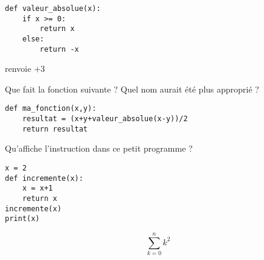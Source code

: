 \begin{frame}[fragile]
\begin{algo}
\begin{lstlisting}
def valeur_absolue(x):
    if x >= 0:
        return x
    else: 
        return -x
\end{lstlisting}
\end{algo}

\pause
{} renvoie $+3$

\bigskip
\pause

Que fait la fonction suivante ? Quel nom aurait été plus approprié ?

\begin{algo}
\begin{lstlisting}
def ma_fonction(x,y):
    resultat = (x+y+valeur_absolue(x-y))/2
    return resultat
\end{lstlisting}
\end{algo}
\end{frame}


%   
%   
%   


\begin{frame}[fragile]

Qu'affiche l'instruction  dans ce petit programme ?

\medskip

\begin{algo}
\begin{lstlisting}
x = 2
def incremente(x):
    x = x+1
    return x
incremente(x)
print(x)
\end{lstlisting}
\end{algo}

\pause
\bigskip

$$\sum_{k=0}^n k^2$$

\end{frame}


